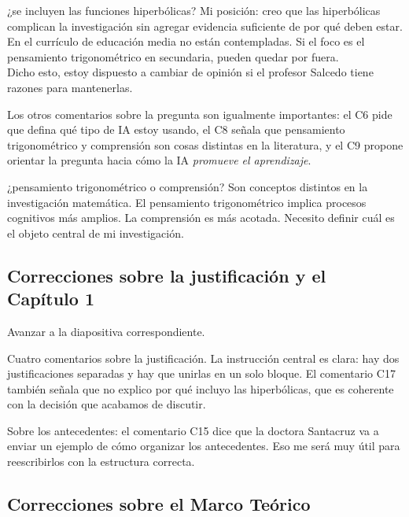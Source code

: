 \documentclass[11pt, letterpaper]{article}
\newenvironment{accion}{%
  \par\smallskip
  \color{GrisAnotacion}\small\itshape\faHandPointRight\enspace
}{%
  \par\smallskip\normalcolor\normalsize\normalfont
}
\begin{document}
\begin{decision}{¿se incluyen las funciones hiperbólicas?}
  Mi posición: creo que las hiperbólicas complican la investigación sin agregar
  evidencia suficiente de por qué deben estar. En el currículo de educación media
  no están contempladas. Si el foco es el pensamiento trigonométrico en
  secundaria, pueden quedar por fuera.\\[4pt]
  Dicho esto, estoy dispuesto a cambiar de opinión si el profesor Salcedo tiene
  razones para mantenerlas.
\end{decision}

Los otros comentarios sobre la pregunta son igualmente importantes: el C6 pide que defina qué tipo de IA estoy usando, el C8 señala que pensamiento trigonométrico y comprensión son cosas distintas en la literatura, y el C9 propone orientar la pregunta hacia cómo la IA \textit{promueve el aprendizaje}.

\begin{decision}{¿pensamiento trigonométrico o comprensión?}
  Son conceptos distintos en la investigación matemática. El pensamiento
  trigonométrico implica procesos cognitivos más amplios. La comprensión es más
  acotada. Necesito definir cuál es el objeto central de mi investigación.
\end{decision}

\subsection{Correcciones sobre la justificación y el Capítulo 1}

\begin{accion}
  Avanzar a la diapositiva correspondiente.
\end{accion}

Cuatro comentarios sobre la justificación. La instrucción central es clara: hay dos justificaciones separadas y hay que unirlas en un solo bloque. El comentario C17 también señala que no explico por qué incluyo las hiperbólicas, que es coherente con la decisión que acabamos de discutir.

Sobre los antecedentes: el comentario C15 dice que la doctora Santacruz va a enviar un ejemplo de cómo organizar los antecedentes. Eso me será muy útil para reescribirlos con la estructura correcta.

\subsection{Correcciones sobre el Marco Teórico}
\end{document}
